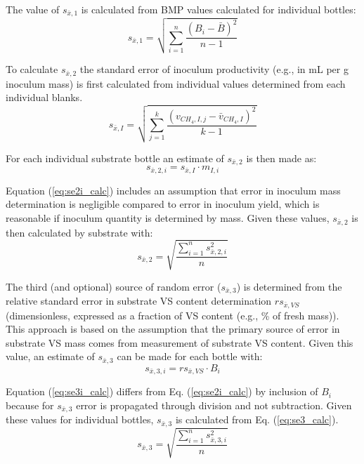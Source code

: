 \documentclass[]{article}
\begin{document}
The value of $s_{\bar{x},1}$ is calculated from BMP values calculated for individual bottles: 
\begin{equation}
  \label{eq:se1_calc}
  s_{\bar{x},1} = \sqrt{\sum_{i=1} ^n \frac{(B_i - \bar{B})^2} {n - 1} }
\end{equation}

To calculate $s_{\bar{x},2}$ the standard error of inoculum  productivity (e.g., in mL per g inoculum mass) is first calculated from individual values determined from each individual blanks. 
\begin{equation}
  \label{eq:seI_calc}
  s_{\bar{x},I} = \sqrt{\sum_{j=1} ^k \frac{(v_{CH_4, I, j} - \bar{v}_{CH_4, I})^2} {k -1} }
\end{equation}

For each individual substrate bottle an estimate of $s_{\bar{x},2}$ is then made as:
\begin{equation}
  \label{eq:se2i_calc}
  s_{\bar{x},2,i} = s_{\bar{x},I} \cdot m_{I, i} 
\end{equation}

Equation (\ref{eq:se2i_calc}) includes an assumption that error in inoculum mass determination is negligible compared to error in inoculum  yield, which is reasonable if inoculum quantity is determined by mass. 
Given these values, $s_{\bar{x},2}$ is then calculated by substrate with:
\begin{equation}
  \label{eq:se2_calc}
  s_{\bar{x},2} = \sqrt{\frac{\sum_{i=1} ^n s_{\bar{x},2,i}^2} {n}}
\end{equation}

The third (and optional) source of random error ($s_{\bar{x},3}$) is determined from the relative standard error in substrate VS content determination $rs_{\bar{x},VS}$ (dimensionless, expressed as a fraction of VS content (e.g., \% of fresh mass)).
This approach is based on the assumption that the primary source of error in substrate VS mass comes from measurement of substrate VS content. 
Given this value, an estimate of $s_{\bar{x},3}$ can be made for each bottle with:
\begin{equation}
  \label{eq:se3i_calc}
  s_{\bar{x},3,i} = rs_{\bar{x},VS} \cdot B_{i}
\end{equation}

Equation (\ref{eq:se3i_calc}) differs from Eq. (\ref{eq:se2i_calc}) by inclusion of $B_{i}$ because for $s_{\bar{x},3}$ error is propagated through division and not subtraction. 
Given these values for individual bottles, $s_{\bar{x},3}$ is calculated from Eq. (\ref{eq:se3_calc}).
\begin{equation}
  \label{eq:se3_calc}
  s_{\bar{x},3} = \sqrt{\frac{\sum_{i=1} ^n s_{\bar{x},3,i}^2} {n}}
\end{equation}
\end{document}
